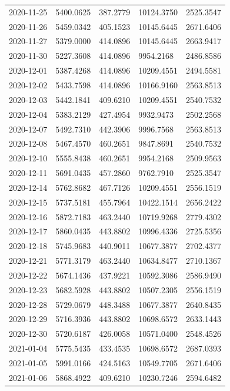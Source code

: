 {\begin{longtable}{lllll}
2020-11-25 & 5400.0625 & 387.2779 & 10124.3750 & 2525.3547 \\
2020-11-26 & 5459.0342 & 405.1523 & 10145.6445 & 2671.6406 \\
2020-11-27 & 5379.0000 & 414.0896 & 10145.6445 & 2663.9417 \\
2020-11-30 & 5227.3608 & 414.0896 & 9954.2168 & 2486.8586 \\
2020-12-01 & 5387.4268 & 414.0896 & 10209.4551 & 2494.5581 \\
2020-12-02 & 5433.7598 & 414.0896 & 10166.9160 & 2563.8513 \\
2020-12-03 & 5442.1841 & 409.6210 & 10209.4551 & 2540.7532 \\
2020-12-04 & 5383.2129 & 427.4954 & 9932.9473 & 2502.2568 \\
2020-12-07 & 5492.7310 & 442.3906 & 9996.7568 & 2563.8513 \\
2020-12-08 & 5467.4570 & 460.2651 & 9847.8691 & 2540.7532 \\
2020-12-10 & 5555.8438 & 460.2651 & 9954.2168 & 2509.9563 \\
2020-12-11 & 5691.0435 & 457.2860 & 9762.7910 & 2525.3547 \\
2020-12-14 & 5762.8682 & 467.7126 & 10209.4551 & 2556.1519 \\
2020-12-15 & 5737.5181 & 455.7964 & 10422.1514 & 2656.2422 \\
2020-12-16 & 5872.7183 & 463.2440 & 10719.9268 & 2779.4302 \\
2020-12-17 & 5860.0435 & 443.8802 & 10996.4336 & 2725.5356 \\
2020-12-18 & 5745.9683 & 440.9011 & 10677.3877 & 2702.4377 \\
2020-12-21 & 5771.3179 & 463.2440 & 10634.8477 & 2710.1367 \\
2020-12-22 & 5674.1436 & 437.9221 & 10592.3086 & 2586.9490 \\
2020-12-23 & 5682.5928 & 443.8802 & 10507.2305 & 2556.1519 \\
2020-12-28 & 5729.0679 & 448.3488 & 10677.3877 & 2640.8435 \\
2020-12-29 & 5716.3936 & 443.8802 & 10698.6572 & 2633.1443 \\
2020-12-30 & 5720.6187 & 426.0058 & 10571.0400 & 2548.4526 \\
2021-01-04 & 5775.5435 & 433.4535 & 10698.6572 & 2687.0393 \\
2021-01-05 & 5991.0166 & 424.5163 & 10549.7705 & 2671.6406 \\
2021-01-06 & 5868.4922 & 409.6210 & 10230.7246 & 2594.6482 \\

\end{longtable}}
